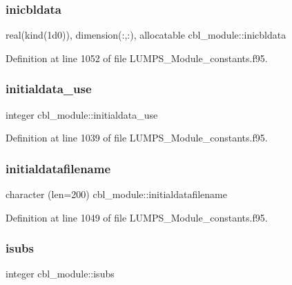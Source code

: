 \subsubsection{\texorpdfstring{inicbldata}{inicbldata}}
{\footnotesize\ttfamily real(kind(1d0)), dimension(\+:,\+:), allocatable cbl\+\_\+module\+::inicbldata}



Definition at line 1052 of file L\+U\+M\+P\+S\+\_\+\+Module\+\_\+constants.\+f95.

\mbox{\label{namespacecbl__module_ad06cbd2f8723521c7d20e7d57ebe0f9c}} 
\subsubsection{\texorpdfstring{initialdata\+\_\+use}{initialdata\_use}}
{\footnotesize\ttfamily integer cbl\+\_\+module\+::initialdata\+\_\+use}



Definition at line 1039 of file L\+U\+M\+P\+S\+\_\+\+Module\+\_\+constants.\+f95.

\mbox{\label{namespacecbl__module_add8682c29dcc92f528e2894dd1e16f39}} 
\subsubsection{\texorpdfstring{initialdatafilename}{initialdatafilename}}
{\footnotesize\ttfamily character (len=200) cbl\+\_\+module\+::initialdatafilename}



Definition at line 1049 of file L\+U\+M\+P\+S\+\_\+\+Module\+\_\+constants.\+f95.

\mbox{\label{namespacecbl__module_a0140016345794a8912c00aafaf50fe1e}} 
\subsubsection{\texorpdfstring{isubs}{isubs}}
{\footnotesize\ttfamily integer cbl\+\_\+module\+::isubs}



